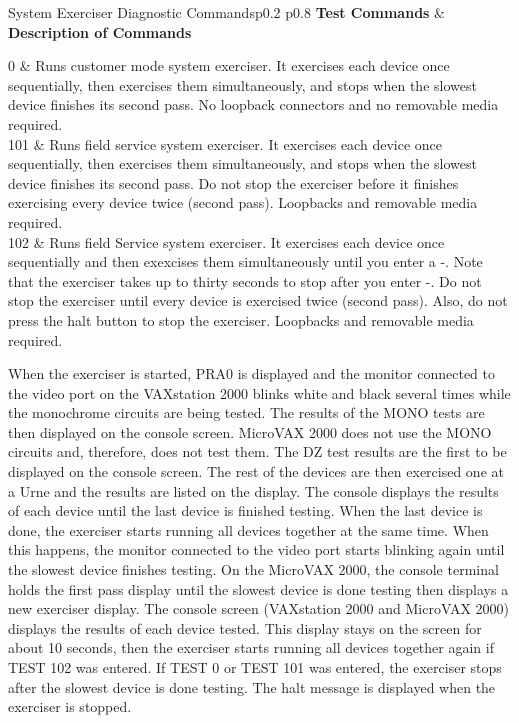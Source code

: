 \begin{tbl}{System Exerciser Diagnostic Commands}{p{0.2\textwidth} p{0.8\textwidth}}
\textbf{Test Commands} 	&	\textbf{Description of Commands} \\
\hline

0						&	Runs customer mode system exerciser. It exercises 
							each device once sequentially, then exercises them 
							simultaneously, and stops when the slowest device
							finishes its second pass. No loopback connectors 
							and no removable media required. \\

101						&	Runs field service system exerciser. It exercises 
							each device once sequentially, then exercises them 
							simultaneously, and stops when the slowest device 
							finishes its second pass. Do not stop the exerciser 
							before it finishes exercising every device twice 
							(second pass). Loopbacks and removable media required. \\

102						&	Runs field Service system exerciser. It exercises each 
							device once sequentially and then exexcises them 
							simultaneously until you enter a -. 
							Note that the exerciser takes up to thirty seconds 
							to stop after you enter -. Do
							not stop the exerciser until every device is exercised 
							twice (second pass). Also, do not press the halt button 
							to stop the exerciser. Loopbacks and removable media required. \\
\end{tbl}

When the exerciser is started, PRA0 is displayed and the monitor connected
to the video port on the VAXstation 2000 blinks white and black several
times while the monochrome circuits are being tested. The results of the
MONO tests are then displayed on the console screen. MicroVAX 2000
does not use the MONO circuits and, therefore, does not test them. The
DZ test results are the first to be displayed on the console screen. The rest
of the devices are then exercised one at a Urne and the results are listed
on the display. The console displays the results of each device until the
last device is finished testing. When the last device is done, the exerciser
starts running all devices together at the same time. When this happens, the
monitor connected to the video port starts blinking again until the slowest
device finishes testing. On the MicroVAX 2000, the console terminal holds
the first pass display until the slowest device is done testing then displays a
new exerciser display. The console screen (VAXstation 2000 and MicroVAX
2000) displays the results of each device tested. This display stays on the
screen for about 10 seconds, then the exerciser starts running all devices
together again if TEST 102 was entered. If TEST 0 or TEST 101 was entered,
the exerciser stops after the slowest device is done testing. The halt message
is displayed when the exerciser is stopped.

